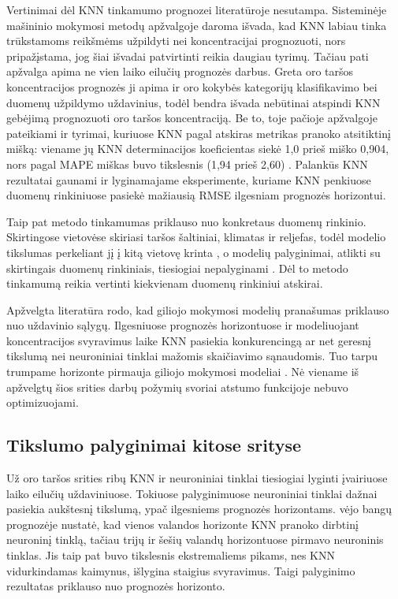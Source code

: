 \documentclass[]{VUMIFTemplateClass}
\begin{document}
    Vertinimai dėl KNN tinkamumo  prognozei literatūroje nesutampa.
    Sisteminėje mašininio mokymosi metodų apžvalgoje \cite{pandya2024} daroma išvada, kad KNN labiau tinka trūkstamoms reikšmėms užpildyti nei koncentracijai prognozuoti, nors pripažįstama, jog šiai išvadai patvirtinti reikia daugiau tyrimų.
    Tačiau pati apžvalga apima ne vien laiko eilučių prognozės darbus.
    Greta oro taršos koncentracijos prognozės ji apima ir oro kokybės kategorijų klasifikavimo bei duomenų užpildymo uždavinius, todėl bendra išvada nebūtinai atspindi KNN gebėjimą prognozuoti oro taršos koncentraciją.
    Be to, toje pačioje apžvalgoje pateikiami ir tyrimai, kuriuose KNN pagal atskiras metrikas pranoko atsitiktinį mišką: viename jų KNN determinacijos koeficientas siekė 1,0 prieš miško 0,904, nors pagal MAPE miškas buvo tikslesnis (1,94 prieš 2,60) \cite{pandya2024}.
    Palankūs KNN rezultatai gaunami ir \cite{das2021} lyginamajame eksperimente, kuriame KNN penkiuose duomenų rinkiniuose pasiekė mažiausią RMSE ilgesniam prognozės horizontui.

    Taip pat metodo tinkamumas priklauso nuo konkretaus duomenų rinkinio.
    Skirtingose vietovėse skiriasi taršos šaltiniai, klimatas ir reljefas, todėl modelio tikslumas perkeliant jį į kitą vietovę krinta \cite{wu2025}, o modelių palyginimai, atlikti su skirtingais duomenų rinkiniais, tiesiogiai nepalyginami \cite{pandya2024}.
    Dėl to metodo tinkamumą reikia vertinti kiekvienam duomenų rinkiniui atskirai.

    Apžvelgta literatūra rodo, kad giliojo mokymosi modelių pranašumas priklauso nuo uždavinio sąlygų.
    Ilgesniuose prognozės horizontuose ir modeliuojant koncentracijos svyravimus laike KNN pasiekia konkurencingą ar net geresnį tikslumą nei neuroniniai tinklai mažomis skaičiavimo sąnaudomis.
    Tuo tarpu trumpame horizonte pirmauja giliojo mokymosi modeliai \cite{das2021}.
    Nė viename iš apžvelgtų šios srities darbų požymių svoriai atstumo funkcijoje nebuvo optimizuojami.


    \subsection{Tikslumo palyginimai kitose srityse}

    Už oro taršos srities ribų KNN ir neuroniniai tinklai tiesiogiai lyginti įvairiuose laiko eilučių uždaviniuose.
    Tokiuose palyginimuose neuroniniai tinklai dažnai pasiekia aukštesnį tikslumą, ypač ilgesniems prognozės horizontams.
    \cite{zamani2008} vėjo bangų prognozėje nustatė, kad vienos valandos horizonte KNN pranoko dirbtinį neuroninį tinklą, tačiau trijų ir šešių valandų horizontuose pirmavo neuroninis tinklas.
    Jis taip pat buvo tikslesnis ekstremaliems pikams, nes KNN vidurkindamas kaimynus, išlygina staigius svyravimus.
    Taigi palyginimo rezultatas priklauso nuo prognozės horizonto.
\end{document}
